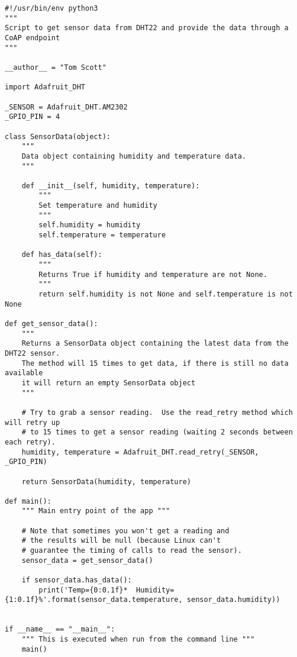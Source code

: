 \begin{verbatim}
#!/usr/bin/env python3
"""
Script to get sensor data from DHT22 and provide the data through a CoAP endpoint
"""

__author__ = "Tom Scott"

import Adafruit_DHT

_SENSOR = Adafruit_DHT.AM2302
_GPIO_PIN = 4

class SensorData(object):
    """
    Data object containing humidity and temperature data.
    """

    def __init__(self, humidity, temperature):
        """
        Set temperature and humidity
        """
        self.humidity = humidity
        self.temperature = temperature

    def has_data(self):
        """
        Returns True if humidity and temperature are not None.
        """
        return self.humidity is not None and self.temperature is not None

def get_sensor_data():
    """
    Returns a SensorData object containing the latest data from the DHT22 sensor.
    The method will 15 times to get data, if there is still no data available
    it will return an empty SensorData object
    """

    # Try to grab a sensor reading.  Use the read_retry method which will retry up
    # to 15 times to get a sensor reading (waiting 2 seconds between each retry).
    humidity, temperature = Adafruit_DHT.read_retry(_SENSOR, _GPIO_PIN)

    return SensorData(humidity, temperature)

def main():
    """ Main entry point of the app """

    # Note that sometimes you won't get a reading and
    # the results will be null (because Linux can't
    # guarantee the timing of calls to read the sensor).
    sensor_data = get_sensor_data()

    if sensor_data.has_data():
        print('Temp={0:0.1f}*  Humidity={1:0.1f}%'.format(sensor_data.temperature, sensor_data.humidity))


if __name__ == "__main__":
    """ This is executed when run from the command line """
    main()
\end{verbatim}
